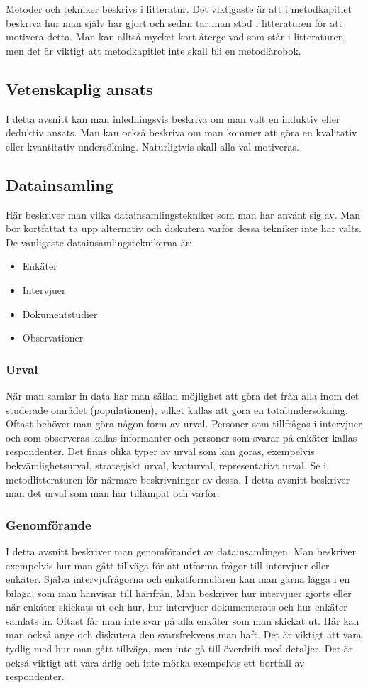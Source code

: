 \documentclass[a4paper,12pt]{article} %
\begin{document}
Metoder och tekniker beskrivs i litteratur. Det viktigaste är att i metodkapitlet beskriva hur man själv har gjort och sedan tar man stöd i litteraturen för att motivera detta. Man kan alltså mycket kort återge vad som står i litteraturen, men det är viktigt att metodkapitlet inte skall bli en metodlärobok. 

\subsection{Vetenskaplig ansats}
I detta avsnitt kan man inledningsvis beskriva om man valt en induktiv eller deduktiv ansats. Man kan också beskriva om man kommer att göra en kvalitativ eller kvantitativ undersökning. Naturligtvis skall alla val motiveras. 

\subsection{Datainsamling}
Här beskriver man vilka datainsamlingstekniker som man har använt sig av. Man bör kortfattat ta upp alternativ och diskutera varför dessa tekniker inte har valts. De vanligaste datainsamlingsteknikerna är:
\begin{itemize}
\item Enkäter
\item Intervjuer
\item Dokumentstudier
\item Observationer
\end{itemize}

\subsubsection{Urval}
När man samlar in data har man sällan möjlighet att göra det från alla inom det studerade området (populationen), vilket kallas att göra en totalundersökning. Oftast behöver man göra någon form av urval. Personer som tillfrågas i intervjuer och som observeras kallas informanter och personer som svarar på enkäter kallas respondenter. Det finns olika typer av urval som kan göras, exempelvis bekvämlighetsurval, strategiskt urval, kvoturval, representativt urval. Se i metodlitteraturen för närmare beskrivningar av dessa. I detta avsnitt beskriver man det urval som man har tillämpat och varför. 

\subsubsection {Genomförande}
I detta avsnitt beskriver man genomförandet av datainsamlingen. Man beskriver exempelvis hur man gått tillväga för att utforma frågor till intervjuer eller enkäter. Själva intervjufrågorna och enkätformulären kan man gärna lägga i en bilaga, som man hänvisar till härifrån. Man beskriver hur intervjuer gjorts eller när enkäter skickats ut och hur, hur intervjuer dokumenterats och hur enkäter samlats in. Oftast får man inte svar på alla enkäter som man skickat ut. Här kan man också ange och diskutera den svarsfrekvens man haft. Det är viktigt att vara tydlig med hur man gått tillväga, men inte gå till överdrift med detaljer. Det är också viktigt att vara ärlig och inte mörka exempelvis ett bortfall av respondenter. 
\end{document}
